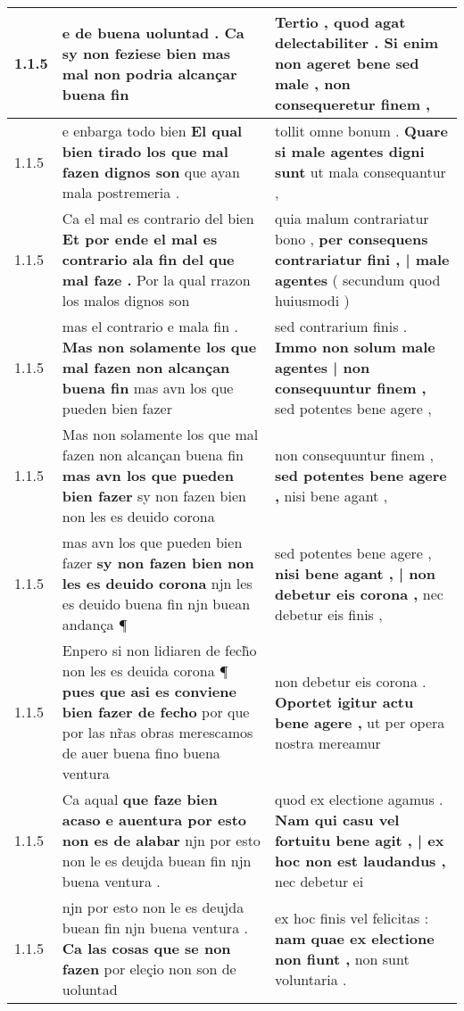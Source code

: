 \begin{tabular}{|p{1cm}|p{6.5cm}|p{6.5cm}|}
1.1.5 & e de buena uoluntad . \textbf{ Ca sy non feziese bien } mas mal non podria alcançar buena fin & Tertio , quod agat delectabiliter . \textbf{ Si enim non ageret bene sed male , } non consequeretur finem , \\\hline
1.1.5 & e enbarga todo bien \textbf{ El qual bien tirado los que mal fazen dignos son } que ayan mala postremeria . & tollit omne bonum . \textbf{ Quare si male agentes digni sunt } ut mala consequantur , \\\hline
1.1.5 & Ca el mal es contrario del bien \textbf{ Et por ende el mal es contrario ala fin del que mal faze . } Por la qual rrazon los malos dignos son & quia malum contrariatur bono , \textbf{ per consequens contrariatur fini , | male agentes } ( secundum quod huiusmodi ) \\\hline
1.1.5 & mas el contrario e mala fin . \textbf{ Mas non solamente los que mal fazen non alcançan buena fin } mas avn los que pueden bien fazer & sed contrarium finis . \textbf{ Immo non solum male agentes | non consequuntur finem , } sed potentes bene agere , \\\hline
1.1.5 & Mas non solamente los que mal fazen non alcançan buena fin \textbf{ mas avn los que pueden bien fazer } sy non fazen bien non les es deuido corona & non consequuntur finem , \textbf{ sed potentes bene agere , } nisi bene agant , \\\hline
1.1.5 & mas avn los que pueden bien fazer \textbf{ sy non fazen bien non les es deuido corona } njn les es deuido buena fin njn buean andança ¶ & sed potentes bene agere , \textbf{ nisi bene agant , | non debetur eis corona , } nec debetur eis finis , \\\hline
1.1.5 & Enpero si non lidiaren de fech̃o non les es deuida corona ¶ \textbf{ pues que asi es conviene bien fazer de fecho } por que por las nr̃as obras merescamos de auer buena fino buena ventura & non debetur eis corona . \textbf{ Oportet igitur actu bene agere , } ut per opera nostra mereamur \\\hline
1.1.5 & Ca aqual \textbf{ que faze bien acaso e auentura por esto non es de alabar } njn por esto non le es deujda buean fin njn buena ventura . & quod ex electione agamus . \textbf{ Nam qui casu vel fortuitu bene agit , | ex hoc non est laudandus , } nec debetur ei \\\hline
1.1.5 & njn por esto non le es deujda buean fin njn buena ventura . \textbf{ Ca las cosas que se non fazen } por eleçio non son de uoluntad & ex hoc finis vel felicitas : \textbf{ nam quae ex electione non fiunt , } non sunt voluntaria . \\\hline

\end{tabular}
